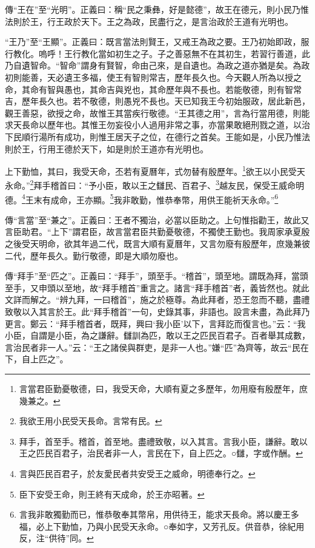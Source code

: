 {\noindent\zhuan{}\fzbyks 傳“王在”至“光明”。正義曰：稱“民之秉彝，好是懿德”，故王在德元，則小民乃惟法則於王，行王政於天下。王之為政，民盡行之，是言治政於王道有光明也。 \par}

{\noindent\shu{}\fzkt “王乃”至“王顯”。正義曰：既言當法則賢王，又戒王為政之要。王乃初始即政，服行教化。嗚呼！王行教化當如初生之子。子之善惡無不在其初生，若習行善道，此乃自遺智命。“智命”謂身有賢智，命由己來，是自遺也。為政之道亦猶是矣。為政初則能善，天必遺王多福，使王有智則常吉，歷年長久也。今天觀人所為以授之命，其命有智與愚也，其命吉與兇也，其命歷年與不長也。若能敬德，則有智常吉，歷年長久也。若不敬德，則愚兇不長也。天已知我王今初始服政，居此新邑，觀王善惡，欲授之命，故惟王其當疾行敬德。“王其德之用”，言為行當用德，則能求天長命以歷年也。其惟王勿妄役小人過用非常之事，亦當果敢絕刑戮之道，以治下民順行湯所有成功，則惟王居天子之位，在德行之首矣。王能如是，小民乃惟法則於王，行用王德於天下，如是則於王道亦有光明也。 \par}

上下勤恤，其曰，我受天命，丕若有夏曆年，式勿替有殷歷年。\footnote{言當君臣勤憂敬德，曰，我受天命，大順有夏之多歷年，勿用廢有殷歷年，庶幾兼之。}欲王以小民受天永命。”\footnote{我欲王用小民受天長命。言常有民。}拜手稽首曰：“予小臣，敢以王之讎民、百君子、\footnote{拜手，首至手。稽首，首至地。盡禮致敬，以入其言。言我小臣，謙辭。敢以王之匹民百君子，治民者非一人，言民在下，自上匹之。○讎，字或作酬。}越友民，保受王威命明德。\footnote{言與匹民百君子，於友愛民者共安受王之威命，明德奉行之。}王末有成命，王亦顯。\footnote{臣下安受王命，則王終有天成命，於王亦昭著。}我非敢勤，惟恭奉幣，用供王能祈天永命。”\footnote{言我非敢獨勤而已，惟恭敬奉其幣帛，用供待王，能求天長命。將以慶王多福，必上下勤恤，乃與小民受天永命。○奉如字，又芳孔反。供音恭，徐紀用反，注“供待”同。}


{\noindent\zhuan{}\fzbyks 傳“言當”至“兼之”。正義曰：王者不獨治，必當以臣助之。上句惟指勸王，故此又言臣助君。“上下”謂君臣，故言當君臣共勤憂敬德，不獨使王勤也。我周家承夏殷之後受天明命，欲其年過二代，既言大順有夏曆年，又言勿廢有殷歷年，庶幾兼彼二代，歷年長久。勤行敬德，即是大順勿廢也。 \par}

{\noindent\zhuan{}\fzbyks 傳“拜手”至“匹之”。正義曰：“拜手”，頭至手。“稽首”，頭至地。謂既為拜，當頭至手，又申頭以至地，故“拜手稽首”重言之。諸言“拜手稽首”者，義皆然也。就此文詳而解之。“辨九拜，一曰稽首”，施之於極尊。為此拜者，恐王忽而不聽，盡禮致敬以入其言於王。此“拜手稽首”一句，史錄其事，非語也。設言未盡，為此拜乃更言。鄭云：“拜手稽首者，既拜，興曰‘我小臣’以下，言拜訖而復言也。”云：“我小臣，自謂是小臣，為之謙辭。讎訓為匹，敢以王之匹民百君子。百者舉其成數，言治民者非一人。”云：“王之諸侯與群吏，是非一人也。”嫌“匹”為齊等，故云“民在下，自上匹之”。 \par}

